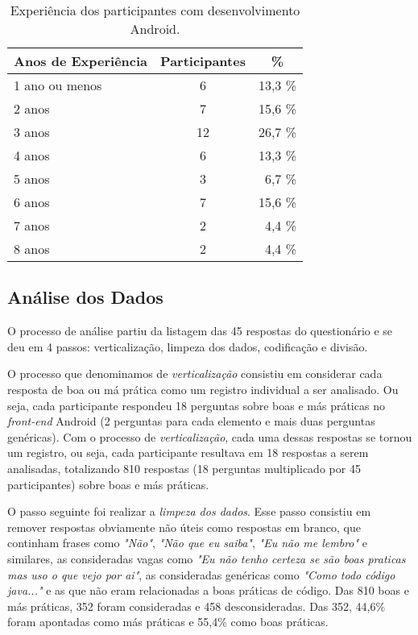 \begin{table}[h]
\centering
\renewcommand*{\arraystretch}{1}
\small
\begin{tabular}{@{}l|c|r@{}}
\toprule
\textbf{Anos de Experiência} & \textbf{Participantes} & \multicolumn{1}{c}{\textbf{\%}}  \\
\hline
1 ano ou menos 	&	 6 		& 	13,3 \%	 \\
2 anos 			& 	 7 		& 	15,6 \%	 \\
3 anos 			& 	 12		& 	26,7 \%	 \\
4 anos 			& 	 6 		& 	13,3 \%	 \\
5 anos 			& 	 3 		& 	 6,7 \%	 \\
6 anos 			& 	 7 		& 	15,6 \%	 \\
7 anos 			& 	 2 		& 	 4,4 \%	 \\
8 anos 			& 	 2 		& 	 4,4 \%	 \\
\toprule
\end{tabular}
\caption{Experiência dos participantes com desenvolvimento Android.}
\label{tab:DadosDemograficos}
\end{table}


\subsection{Análise dos Dados}
\label{sub:smells-definition}

O processo de análise partiu da listagem das 45 respostas do questionário e se deu em 4 passos: verticalização, limpeza dos dados, codificação e divisão. 

O processo que denominamos de \textit{verticalização} consistiu em considerar cada resposta de boa ou má prática como um registro individual a ser analisado. Ou seja, cada participante respondeu 18 perguntas sobre boas e más práticas no \textit{front-end} Android (2 perguntas para cada elemento e mais duas perguntas genéricas). Com o processo de \textit{verticalização}, cada uma dessas respostas se tornou um registro, ou seja, cada participante resultava em 18 respostas a serem analisadas, totalizando 810 respostas (18 perguntas multiplicado por 45 participantes) sobre boas e más práticas.

O passo seguinte foi realizar a \textit{limpeza dos dados}. Esse passo consistiu em remover respostas obviamente não úteis como respostas em branco, que continham frases como \textit{"Não"}, \textit{"Não que eu saiba"}, \textit{"Eu não me lembro"} e similares, as consideradas vagas como \textit{"Eu não tenho certeza se são boas praticas mas uso o que vejo por ai"}, as consideradas genéricas como \textit{"Como todo código java..."} e as que não eram relacionadas a boas práticas de código. Das 810 boas e más práticas, 352 foram consideradas e 458 desconsideradas. Das 352, 44,6\% foram apontadas como más práticas e 55,4\% como boas práticas. 


